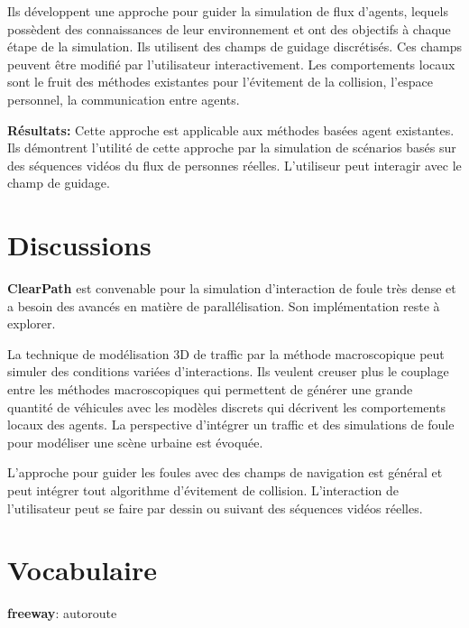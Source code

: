 \documentclass[11pt]{article}
\begin{document}
Ils développent une approche pour guider la simulation de flux d'agents, lequels possèdent des connaissances de leur environnement et ont des objectifs à chaque étape de la simulation. Ils utilisent des champs de guidage discrétisés. Ces champs peuvent être modifié par l'utilisateur interactivement. Les comportements locaux sont le fruit des méthodes existantes pour l'évitement de la collision, l'espace personnel, la communication entre agents.

\textbf{Résultats:} Cette approche est applicable aux méthodes basées agent existantes. Ils démontrent l'utilité de cette approche par la simulation de scénarios  basés sur des séquences vidéos du flux de personnes réelles. L'utiliseur peut interagir avec le champ de guidage.

\section{Discussions}

\textbf{ClearPath} est convenable pour la simulation d'interaction de foule très dense et a besoin des avancés en matière de parallélisation. Son implémentation reste à explorer.

La technique de modélisation 3D de traffic par la méthode macroscopique peut simuler des conditions variées d'interactions. Ils veulent creuser plus le couplage entre les méthodes macroscopiques qui permettent de générer une grande quantité de véhicules avec les modèles discrets qui décrivent les comportements locaux des agents. La perspective d'intégrer un traffic et des simulations de foule pour modéliser une scène urbaine est évoquée.

L'approche pour guider les foules avec des champs de navigation est général et peut intégrer tout algorithme d'évitement de collision. L'interaction de l'utilisateur peut se faire par dessin ou suivant des séquences vidéos réelles.

\section{Vocabulaire}

\textbf{freeway}: autoroute
\end{document}
